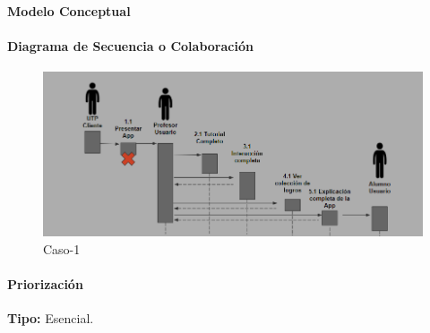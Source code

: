 \paragraph{Modelo Conceptual}


\paragraph{Diagrama de Secuencia o Colaboración}

\begin{figure}[H]
\centerline{\includegraphics[width=15cm]{imgs/CasoUso_8_2.PNG}}
\caption{Caso-1}
\label{fig}
\end{figure}

\paragraph{Priorización}
{\textbf {Tipo:}}
Esencial.